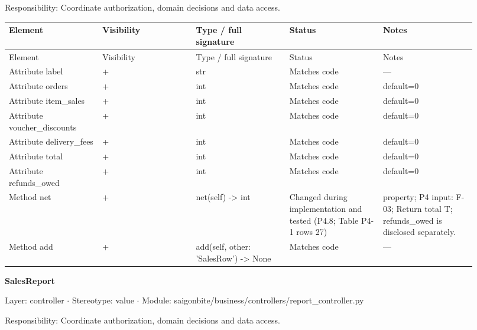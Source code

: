 Responsibility: Coordinate authorization, domain decisions and data access.

\begin{longtable}{>{\raggedright\arraybackslash}p{0.1840\linewidth}>{\raggedright\arraybackslash}p{0.1840\linewidth}>{\raggedright\arraybackslash}p{0.1840\linewidth}>{\raggedright\arraybackslash}p{0.1840\linewidth}>{\raggedright\arraybackslash}p{0.1840\linewidth}}
Element & Visibility & Type / full signature & Status & Notes \\
\hline\endfirsthead
Element & Visibility & Type / full signature & Status & Notes \\
\hline\endhead
Attribute label & + & str & Matches code & --- \\
Attribute orders & + & int & Matches code & default=0 \\
Attribute item\_sales & + & int & Matches code & default=0 \\
Attribute voucher\_discounts & + & int & Matches code & default=0 \\
Attribute delivery\_fees & + & int & Matches code & default=0 \\
Attribute total & + & int & Matches code & default=0 \\
Attribute refunds\_owed & + & int & Matches code & default=0 \\
Method net & + & net(self) -\textgreater{} int & Changed during implementation and tested (P4.8; Table P4-1 rows 27) & property; P4 input: F-03; Return total T; refunds\_owed is disclosed separately. \\
Method add & + & add(self, other: 'SalesRow') -\textgreater{} None & Matches code & --- \\
\end{longtable}
\textbf{SalesReport}

Layer: controller \ensuremath{\cdot} Stereotype: \guillemotleft{}value\guillemotright{} \ensuremath{\cdot} Module: saigonbite/business/controllers/report\_controller.py

Responsibility: Coordinate authorization, domain decisions and data access.

